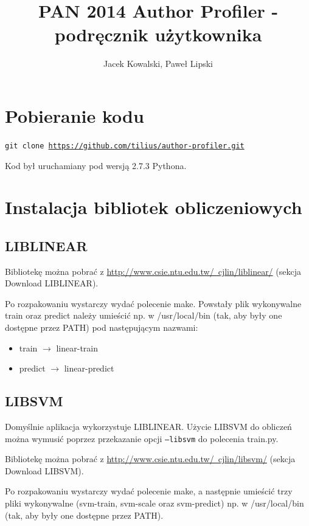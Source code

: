 \documentclass{article}
\title {PAN 2014 Author Profiler - podręcznik użytkownika}
\author{Jacek Kowalski, Paweł Lipski}
\begin{document}
\maketitle

\section{Pobieranie kodu}

\texttt{git clone \href{https://github.com/tilius/author-profiler.git}{https://github.com/tilius/author-profiler.git}}

Kod był uruchamiany pod wersją 2.7.3 Pythona.

\section{Instalacja bibliotek obliczeniowych}

\subsection{LIBLINEAR}

Bibliotekę można pobrać z \href{http://www.csie.ntu.edu.tw/~cjlin/liblinear/}{http://www.csie.ntu.edu.tw/~cjlin/liblinear/} (sekcja Download LIBLINEAR).

Po rozpakowaniu wystarczy wydać polecenie make. Powstały plik wykonywalne train oraz predict należy umieścić np. w /usr/local/bin (tak, aby były one dostępne przez PATH) pod następującym nazwami:
\begin{itemize}
\item train $\rightarrow$ linear-train
\item predict $\rightarrow$ linear-predict
\end{itemize}

\subsection{LIBSVM}

Domyślnie aplikacja wykorzystuje LIBLINEAR. Użycie LIBSVM do obliczeń można wymusić poprzez przekazanie opcji \texttt{--libsvm} do polecenia train.py.

Bibliotekę można pobrać z \href{http://www.csie.ntu.edu.tw/~cjlin/libsvm/}{http://www.csie.ntu.edu.tw/~cjlin/libsvm/} (sekcja Download LIBSVM).

Po rozpakowaniu wystarczy wydać polecenie make, a następnie umieścić trzy pliki wykonywalne (svm-train, svm-scale oraz svm-predict) np. w /usr/local/bin (tak, aby były one dostępne przez PATH).
\end{document}
